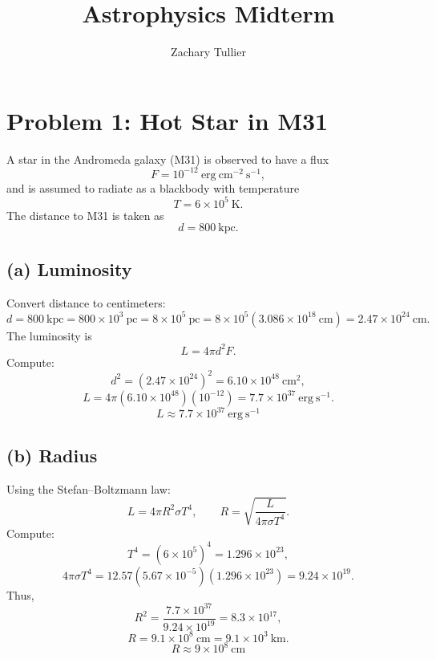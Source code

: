\documentclass[12pt]{article}
\begin{document}
\singlespacing  %
\title{Astrophysics Midterm}

\author[1]{Zachary Tullier}
\date{}
\maketitle

\section*{Problem 1: Hot Star in M31}

A star in the Andromeda galaxy (M31) is observed to have a flux
\[
F = 10^{-12}~\mathrm{erg~cm^{-2}~s^{-1}},
\]
and is assumed to radiate as a blackbody with temperature
\[
T = 6\times 10^{5}~\mathrm{K}.
\]
The distance to M31 is taken as
\[
d = 800~\mathrm{kpc}.
\]

\subsection*{(a) Luminosity}

Convert distance to centimeters:
\[
d = 800~\mathrm{kpc}
  = 800\times 10^{3}~\mathrm{pc}
  = 8\times 10^{5}~\mathrm{pc}
  = 8\times 10^{5}(3.086\times 10^{18}~\mathrm{cm})
  = 2.47\times 10^{24}~\mathrm{cm}.
\]
The luminosity is
\[
L = 4\pi d^{2}F.
\]
Compute:
\[
d^{2} = (2.47\times 10^{24})^{2} = 6.10\times 10^{48}~\mathrm{cm^{2}},
\]
\[
L = 4\pi(6.10\times 10^{48})(10^{-12})
  = 7.7\times 10^{37}~\mathrm{erg~s^{-1}}.
\]
\[
\boxed{L \approx 7.7\times 10^{37}~\mathrm{erg~s^{-1}}}
\]

\subsection*{(b) Radius}

Using the Stefan--Boltzmann law:
\[
L = 4\pi R^{2}\sigma T^{4},
\qquad
R = \sqrt{\frac{L}{4\pi\sigma T^{4}}}.
\]
Compute:
\[
T^{4} = (6\times 10^{5})^{4}
      = 1.296\times 10^{23},
\]
\[
4\pi\sigma T^{4}
  = 12.57(5.67\times 10^{-5})(1.296\times 10^{23})
  = 9.24\times 10^{19}.
\]
Thus,
\[
R^{2} = \frac{7.7\times 10^{37}}{9.24\times 10^{19}}
      = 8.3\times 10^{17},
\]
\[
R = 9.1\times 10^{8}~\mathrm{cm} = 9.1\times 10^{3}~\mathrm{km}.
\]
\[
\boxed{R \approx 9\times 10^{8}~\mathrm{cm}}
\]
\end{document}
